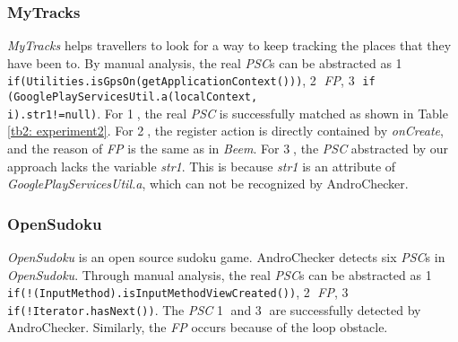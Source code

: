 \subsubsection{MyTracks}
\textit{MyTracks} helps travellers to look for a way to keep tracking the places that they have been to. 
By manual analysis, the real \textit{PSC}s can be abstracted as  \textcircled{1} \texttt{if(Utilities.isGpsOn(getApplicationContext()))}, \textcircled{2} \textit{FP}, \textcircled{3} \texttt{if (GooglePlayServicesUtil.a(localContext,}\\
 \texttt{i).str1!=null)}. For \textcircled{1}, the real \textit{PSC} is successfully matched as shown in Table \ref{tb2: experiment2}. For \textcircled{2}, the register action is directly contained by \textit{onCreate}, and the reason of \textit{FP} is the same as in \textit{Beem}. For \textcircled{3}, the \textit{PSC} abstracted by our approach lacks the variable \textit{str1}. This is because \textit{str1} is an attribute of \textit{GooglePlayServicesUtil.a},  which can not be recognized by AndroChecker.

\subsubsection{OpenSudoku}
\textit{OpenSudoku} is an open source sudoku game. AndroChecker detects six \textit{PSC}s in \textit{OpenSudoku}.
Through manual analysis, the real \textit{PSC}s can be abstracted as \textcircled{1} \texttt{if(!(InputMethod).isInputMethodViewCreated())}, \textcircled{2} \textit{FP}, \textcircled{3} \texttt{if(!Iterator.hasNext())}.
The \textit{PSC} \textcircled{1} and \textcircled{3} are successfully detected by AndroChecker. %
Similarly, %
the \textit{FP} occurs because of the loop obstacle.





